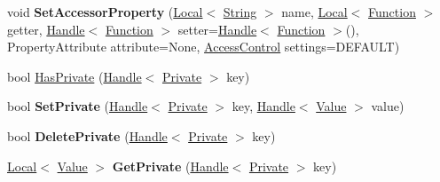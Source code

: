 \begin{DoxyCompactItemize}
\item 
\hypertarget{classv8_1_1_object_a4ba2e3e2de77181a0aa48c55c94d2917}{}void {\bfseries Set\+Accessor\+Property} (\hyperlink{classv8_1_1_local}{Local}$<$ \hyperlink{classv8_1_1_string}{String} $>$ name, \hyperlink{classv8_1_1_local}{Local}$<$ \hyperlink{classv8_1_1_function}{Function} $>$ getter, \hyperlink{classv8_1_1_handle}{Handle}$<$ \hyperlink{classv8_1_1_function}{Function} $>$ setter=\hyperlink{classv8_1_1_handle}{Handle}$<$ \hyperlink{classv8_1_1_function}{Function} $>$(), Property\+Attribute attribute=None, \hyperlink{namespacev8_a31d8355cb043d7d2dda3f4a52760b64e}{Access\+Control} settings=D\+E\+F\+A\+U\+L\+T)\label{classv8_1_1_object_a4ba2e3e2de77181a0aa48c55c94d2917}

\item 
bool \hyperlink{classv8_1_1_object_a5b6c320c5a31e2a3ddbd464835c8e9a7}{Has\+Private} (\hyperlink{classv8_1_1_handle}{Handle}$<$ \hyperlink{classv8_1_1_private}{Private} $>$ key)
\item 
\hypertarget{classv8_1_1_object_abb91701c8fbad34a4c0ccd3c7e18be28}{}bool {\bfseries Set\+Private} (\hyperlink{classv8_1_1_handle}{Handle}$<$ \hyperlink{classv8_1_1_private}{Private} $>$ key, \hyperlink{classv8_1_1_handle}{Handle}$<$ \hyperlink{classv8_1_1_value}{Value} $>$ value)\label{classv8_1_1_object_abb91701c8fbad34a4c0ccd3c7e18be28}

\item 
\hypertarget{classv8_1_1_object_a4751605ba0c560846832783efca46c71}{}bool {\bfseries Delete\+Private} (\hyperlink{classv8_1_1_handle}{Handle}$<$ \hyperlink{classv8_1_1_private}{Private} $>$ key)\label{classv8_1_1_object_a4751605ba0c560846832783efca46c71}

\item 
\hypertarget{classv8_1_1_object_a6d99ef0c7c505f1b7182f9fc11f373b0}{}\hyperlink{classv8_1_1_local}{Local}$<$ \hyperlink{classv8_1_1_value}{Value} $>$ {\bfseries Get\+Private} (\hyperlink{classv8_1_1_handle}{Handle}$<$ \hyperlink{classv8_1_1_private}{Private} $>$ key)\label{classv8_1_1_object_a6d99ef0c7c505f1b7182f9fc11f373b0}


\end{DoxyCompactItemize}
